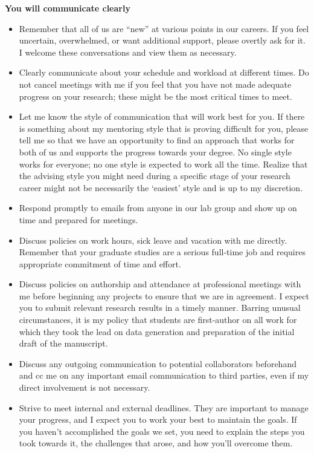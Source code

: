 \documentclass{article}
\begin{document}
\textbf{You will communicate clearly}
\begin{itemize}
\item Remember that all of us are ``new'' at various points in our careers. If you feel uncertain, overwhelmed,
or want additional support, please overtly ask for it. I welcome these conversations and
view them as necessary.
\item  Clearly communicate about your schedule and workload at different times. Do not cancel meetings with me if you feel that you have not made adequate progress on your research; these might be the most critical times to
meet.
\item  Let me know the style of communication that will work best for you.  If there is
something about my mentoring style that is proving difficult for you, please tell me so that we have an opportunity to find an approach that works for both of us and supports the progress towards your degree. No single style works for everyone; no one style is expected to work all the time. Realize that the advising style you might need during a specific stage of your research career might not be necessarily the `easiest' style and is up to my discretion.
\item  Respond promptly to emails from anyone in our lab group and show up on time and prepared for meetings. 
\item  Discuss policies on work hours, sick leave and vacation with me directly. Remember that your graduate studies are a serious full-time job and requires appropriate commitment of time and effort. 
\item  Discuss policies on authorship and attendance at professional meetings with me before
beginning any projects to ensure that we are in agreement. I expect you to submit relevant
research results in a timely manner. Barring unusual circumstances, it is my policy that students
are first-author on all work for which they took the lead on data generation and preparation of the
initial draft of the manuscript.
\item Discuss any outgoing communication to potential collaborators beforehand and cc me on any important email communication to third parties, even if my direct involvement is not necessary.
\item Strive to meet internal and external deadlines. They are important to manage your progress, and I expect you to work your best to maintain the goals. If you haven't accomplished the goals we set, you need to explain the steps you took towards it, the challenges that arose, and how you'll overcome them.
\end{itemize}
\end{document}

